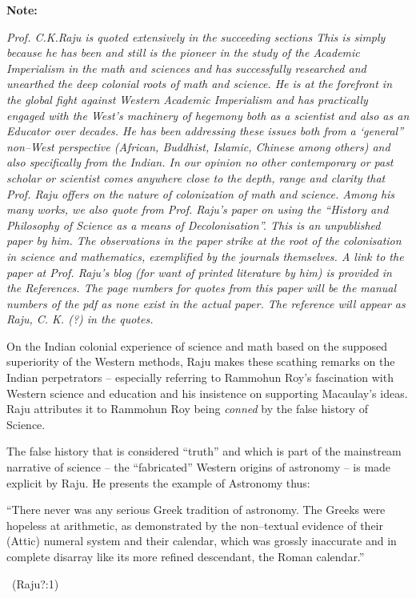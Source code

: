 \vskip 4pt

\textbf{Note:}

\vskip 4pt

\textit{Prof. C.K.Raju is quoted extensively in the succeeding sections This is simply because he has been and still is the pioneer in the study of the Academic Imperialism in the math and sciences and has successfully researched and unearthed the deep colonial roots of math and science. He is at the forefront in the global fight against Western Academic Imperialism and has practically engaged with the West’s machinery of hegemony both as a scientist and also as an Educator over decades. He has been addressing these issues both from a ‘general” non–West perspective (African, Buddhist, Islamic, Chinese among others) and also specifically from the Indian. In our opinion no other contemporary or past scholar or scientist comes anywhere close to the depth, range and clarity that Prof. Raju offers on the nature of colonization of math and science. Among his many works, we also quote from Prof. Raju’s paper on using the “History and Philosophy of Science as a means of Decolonisation”. This is an unpublished paper by him. The observations in the paper strike at the root of the colonisation in science and mathematics, exemplified by the journals themselves. A link to the paper at Prof. Raju’s blog (for want of printed literature by him) is provided in the References. The page numbers for quotes from this paper will be the manual numbers of the pdf as none exist in the actual paper. The reference will appear as Raju, C. K. (?) in the quotes.}

\vskip 3pt

On the Indian colonial experience of science and math based on the supposed superiority of the Western methods, Raju makes these scathing remarks on the Indian perpetrators – especially referring to Rammohun Roy’s fascination with Western science and education and his insistence on supporting Macaulay’s ideas. Raju attributes it to Rammohun Roy being \textit{conned} by the false history of Science.

The false history that is considered “truth” and which is part of the mainstream narrative of science – the “fabricated” Western origins of astronomy – is made explicit by Raju. He presents the example of Astronomy thus:

\begin{myquote}
“There never was any serious Greek tradition of astronomy. The Greeks were hopeless at arithmetic, as demonstrated by the non–textual evidence of their (Attic) numeral system and their calendar, which was grossly inaccurate and in complete disarray like its more refined descendant, the Roman calendar.” 

~\hfill (Raju?:1)
\end{myquote}


